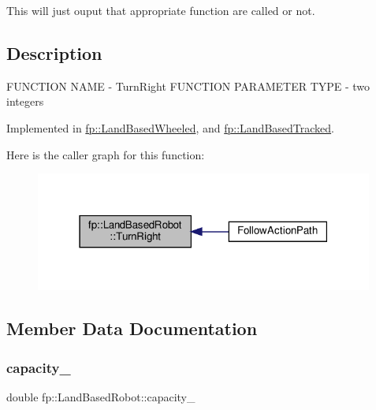 This will just ouput that appropriate function are called or not. 

\hypertarget{main_8cpp_Description}{}\subsection{Description}\label{main_8cpp_Description}
F\+U\+N\+C\+T\+I\+ON N\+A\+ME -\/ Turn\+Right F\+U\+N\+C\+T\+I\+ON P\+A\+R\+A\+M\+E\+T\+ER T\+Y\+PE -\/ two integers 

Implemented in \hyperlink{classfp_1_1_land_based_wheeled_ac6e93b00e624e281a497e99729db04e7}{fp\+::\+Land\+Based\+Wheeled}, and \hyperlink{classfp_1_1_land_based_tracked_a619c29950f6c484d3481e31ff01dad3a}{fp\+::\+Land\+Based\+Tracked}.

Here is the caller graph for this function\+:
\nopagebreak
\begin{figure}[H]
\begin{center}
\leavevmode
\includegraphics[width=315pt]{classfp_1_1_land_based_robot_a7360e4084bc5254f72ab0d3612644907_icgraph}
\end{center}
\end{figure}


\subsection{Member Data Documentation}
\mbox{\label{classfp_1_1_land_based_robot_a542d90c7c62899e3c3cf28791bbb6c8e}} 
\subsubsection{\texorpdfstring{capacity\+\_\+}{capacity\_}}
{\footnotesize\ttfamily double fp\+::\+Land\+Based\+Robot\+::capacity\+\_\+\hspace{0.3cm}{\ttfamily [protected]}}

